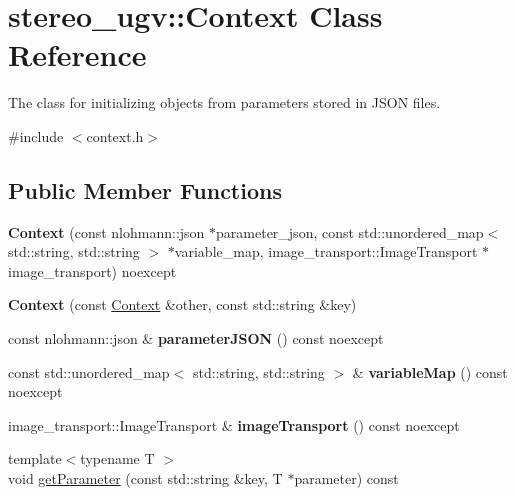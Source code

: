 \hypertarget{classstereo__ugv_1_1Context}{}\section{stereo\+\_\+ugv\+:\+:Context Class Reference}
\label{classstereo__ugv_1_1Context}


The class for initializing objects from parameters stored in J\+S\+ON files.  




{\ttfamily \#include $<$context.\+h$>$}

\subsection*{Public Member Functions}
\begin{DoxyCompactItemize}
\item 
\mbox{\label{classstereo__ugv_1_1Context_a408832fdf3245f3d91c9ea794ebbc71c}} 
{\bfseries Context} (const nlohmann\+::json $\ast$parameter\+\_\+json, const std\+::unordered\+\_\+map$<$ std\+::string, std\+::string $>$ $\ast$variable\+\_\+map, image\+\_\+transport\+::\+Image\+Transport $\ast$image\+\_\+transport) noexcept
\item 
\mbox{\label{classstereo__ugv_1_1Context_a2c89fdaa8a60d2b8d1dae87e11142f03}} 
{\bfseries Context} (const \hyperlink{classstereo__ugv_1_1Context}{Context} \&other, const std\+::string \&key)
\item 
\mbox{\label{classstereo__ugv_1_1Context_aa76ed7cb15d73cf98aa1c4d09ff0ed6b}} 
const nlohmann\+::json \& {\bfseries parameter\+J\+S\+ON} () const noexcept
\item 
\mbox{\label{classstereo__ugv_1_1Context_ad2fb0b84ec60e19b0224970267240b78}} 
const std\+::unordered\+\_\+map$<$ std\+::string, std\+::string $>$ \& {\bfseries variable\+Map} () const noexcept
\item 
\mbox{\label{classstereo__ugv_1_1Context_ae31464b51727e7980eaf5f7667000a79}} 
image\+\_\+transport\+::\+Image\+Transport \& {\bfseries image\+Transport} () const noexcept
\item 
{\footnotesize template$<$typename T $>$ }\\void \hyperlink{classstereo__ugv_1_1Context_a1996f3d3213ab26a3ba84a1c0cf7b62e}{get\+Parameter} (const std\+::string \&key, T $\ast$parameter) const

\end{DoxyCompactItemize}
